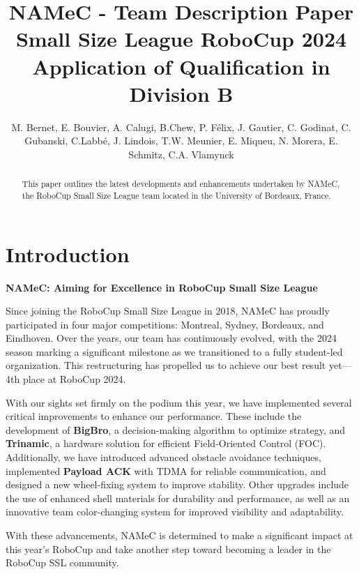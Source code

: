 \title{
  NAMeC - Team Description Paper \\
  Small Size League RoboCup 2024 \\
  Application of Qualification in Division B
}


\author{
    M. Bernet, E. Bouvier, A. Calugi, B.Chew, P. Félix, J. Gautier, C. Godinat, C. Gubanski,
    C.Labbé, J. Lindois, T.W. Meunier, E. Miqueu, N. Morera, E. Schmitz, C.A. Vlamynck
}



\maketitle

\begin{abstract}
  This paper outlines the latest developments and enhancements undertaken by NAMeC, the RoboCup Small Size League team located in the University of Bordeaux, France.
\end{abstract}


\section{Introduction}

\textbf{NAMeC: Aiming for Excellence in RoboCup Small Size League}

Since joining the RoboCup Small Size League in 2018, NAMeC has proudly participated in four major competitions: Montreal, Sydney, Bordeaux, and Eindhoven. Over the years, our team has continuously evolved, with the 2024 season marking a significant milestone as we transitioned to a fully student-led organization. This restructuring has propelled us to achieve our best result yet—4th place at RoboCup 2024.

With our sights set firmly on the podium this year, we have implemented several critical improvements to enhance our performance. These include the development of \textbf{BigBro}, a decision-making algorithm to optimize strategy, and \textbf{Trinamic}, a hardware solution for efficient Field-Oriented Control (FOC). Additionally, we have introduced advanced obstacle avoidance techniques, implemented \textbf{Payload ACK} with TDMA for reliable communication, and designed a new wheel-fixing system to improve stability. Other upgrades include the use of enhanced shell materials for durability and performance, as well as an innovative team color-changing system for improved visibility and adaptability.

With these advancements, NAMeC is determined to make a significant impact at this year’s RoboCup and take another step toward becoming a leader in the RoboCup SSL community.

